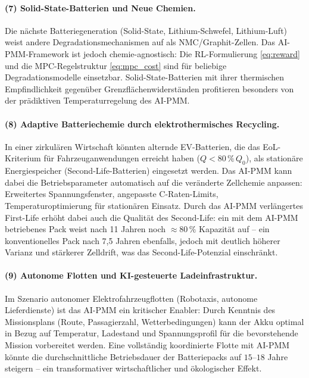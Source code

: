 ﻿\documentclass[12pt,a4paper]{article}
\begin{document}
	\paragraph{(7) Solid-State-Batterien und Neue Chemien.}
	Die nächste Batteriegeneration (Solid-State, Lithium-Schwefel, Lithium-Luft)
	weist andere Degradationsmechanismen auf als NMC/Graphit-Zellen. Das
	AI-PMM-Framework ist jedoch chemie-agnostisch: Die RL-Formulierung
	\eqref{eq:reward} und die MPC-Regelstruktur \eqref{eq:mpc_cost} sind
	für beliebige Degradationsmodelle einsetzbar. Solid-State-Batterien mit
	ihrer thermischen Empfindlichkeit gegenüber Grenzflächenwiderständen
	profitieren besonders von der prädiktiven Temperaturregelung des AI-PMM.
	
	\paragraph{(8) Adaptive Batteriechemie durch elektro\-thermisches Recycling.}
	In einer zirkulären Wirtschaft könnten alternde EV-Batterien, die das
	EoL-Kriterium für Fahrzeuganwendungen erreicht haben ($Q < 80\,\%\,Q_0$),
	als stationäre Energiespeicher (Second-Life-Batterien) eingesetzt werden.
	Das AI-PMM kann dabei die Betriebsparameter automatisch auf die veränderte
	Zellchemie anpassen: Erweitertes Spannungsfenster, angepasste
	C-Raten-Limits, Temperaturoptimierung für stationären Einsatz. Durch das
	AI-PMM verlängertes First-Life erhöht dabei auch die Qualität des Second-Life:
	ein mit dem AI-PMM betriebenes Pack weist nach 11 Jahren noch $\approx 80\,\%$
	Kapazität auf -- ein konventionelles Pack nach 7{,}5 Jahren ebenfalls,
	jedoch mit deutlich höherer Varianz und stärkerer Zelldrift, was das
	Second-Life-Potenzial einschränkt.
	
	\paragraph{(9) Autonome Flotten und KI-gesteuerte Ladeinfrastruktur.}
	Im Szenario autonomer Elektrofahrzeugflotten (Robotaxis, autonome Lieferdienste)
	ist das AI-PMM ein kritischer Enabler: Durch Kenntnis des Missionsplans
	(Route, Passagierzahl, Wetterbedingungen) kann der Akku optimal in Bezug
	auf Temperatur, Ladestand und Spannungsprofil für die bevorstehende Mission
	vorbereitet werden. Eine vollständig koordinierte Flotte mit AI-PMM könnte
	die durchschnittliche Betriebsdauer der Batteriepacks auf
	$15\text{--}18$ Jahre steigern -- ein transformativer wirtschaftlicher
	und ökologischer Effekt.
	
\end{document}
